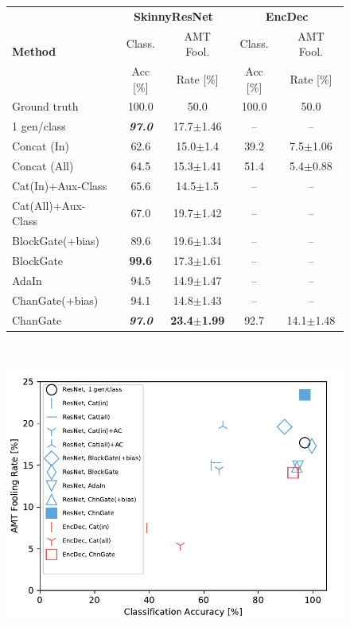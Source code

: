 \begin{figure}[t]
  \centering
  \begin{minipage}[b]{0.5\linewidth}  
  \scalebox{0.84} {
  \begin{tabular}{l c c c c}
  \toprule
    \multirow{3}{*}{\textbf{Method}} & \multicolumn{2}{c}{ {\bf SkinnyResNet}} & \multicolumn{2}{c}{ {\bf EncDec}} \\ \cmidrule(l){2-3} \cmidrule(l){4-5}
	& Class. & AMT Fool. & Class. & AMT Fool. \\
	& Acc [\%] & Rate [\%] & Acc [\%] & Rate [\%] \\ \midrule
    Ground truth & 100.0 & 50.0 & 100.0 & 50.0 \\ \midrule
    1 gen/class & \textbf{\textit{97.0}} & 17.7$\pm$1.46 & -- & -- \\ \midrule
    Concat (In)	& 62.6 & 15.0$\pm$1.4 & 39.2 & 7.5$\pm$1.06 \\ 
    Concat (All) & 64.5 & 15.3$\pm$1.41 & 51.4 & 5.4$\pm$0.88 \\ \midrule
    Cat(In)+Aux-Class & 65.6 & 14.5$\pm$1.5 & -- & -- \\ 
    Cat(All)+Aux-Class & 67.0 & 19.7$\pm$1.42 & -- & --\\ \midrule
    BlockGate(+bias) & 89.6 & 19.6$\pm$1.34 & -- & --\\ 
    BlockGate & {\bf 99.6} & 17.3$\pm$1.61 & -- & --\\ 
    AdaIn & 94.5 & 14.9$\pm$1.47 & -- & --\\ 
    ChanGate(+bias) & 94.1 & 14.8$\pm$1.43 & -- & --\\ 
    ChanGate & \textbf{\textit{97.0}} & {\bf 23.4$\pm$1.99} & 92.7 & 14.1$\pm$1.48 \\ 
	\hline
	\end{tabular} } \\
  \end{minipage}
  \begin{minipage}[b]{0.48\linewidth}
  \includegraphics[width=\linewidth]{paper_images/gen_real_vs_acc.pdf} 

\end{minipage}
\end{figure}
